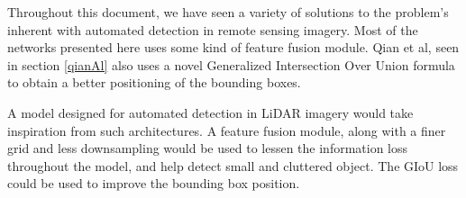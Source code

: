 Throughout this document, we have seen a variety of solutions to the problem's inherent with automated detection in remote sensing imagery. Most of the networks presented here uses some kind of feature fusion module. Qian et al, seen in section \ref{qianAl} also uses a novel Generalized Intersection Over Union formula to obtain a better positioning of the bounding boxes. 

A model designed for automated detection in LiDAR imagery would take inspiration from such architectures. A feature fusion module, along with a finer grid and less downsampling would be used to lessen the information loss throughout the model, and help detect small and cluttered object. The GIoU loss could be used to improve the bounding box position. 
